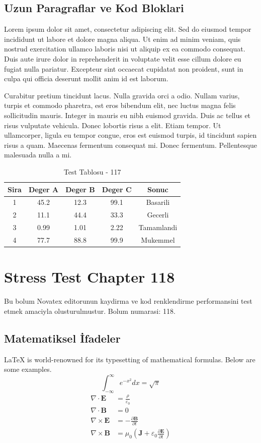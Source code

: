 \documentclass[12pt,a4paper]{article}
\begin{document}
\subsection{Uzun Paragraflar ve Kod Bloklari}
Lorem ipsum dolor sit amet, consectetur adipiscing elit. Sed do eiusmod tempor incididunt ut labore et dolore magna aliqua. Ut enim ad minim veniam, quis nostrud exercitation ullamco laboris nisi ut aliquip ex ea commodo consequat. Duis aute irure dolor in reprehenderit in voluptate velit esse cillum dolore eu fugiat nulla pariatur. Excepteur sint occaecat cupidatat non proident, sunt in culpa qui officia deserunt mollit anim id est laborum.

Curabitur pretium tincidunt lacus. Nulla gravida orci a odio. Nullam varius, turpis et commodo pharetra, est eros bibendum elit, nec luctus magna felis sollicitudin mauris. Integer in mauris eu nibh euismod gravida. Duis ac tellus et risus vulputate vehicula. Donec lobortis risus a elit. Etiam tempor. Ut ullamcorper, ligula eu tempor congue, eros est euismod turpis, id tincidunt sapien risus a quam. Maecenas fermentum consequat mi. Donec fermentum. Pellentesque malesuada nulla a mi.

\begin{table}[h!]
\centering
\begin{tabular}{|c|c|c|c|c|}
\hline
\textbf{Sira} & \textbf{Deger A} & \textbf{Deger B} & \textbf{Deger C} & \textbf{Sonuc} \\
\hline
1 & 45.2 & 12.3 & 99.1 & Basarili \\
2 & 11.1 & 44.4 & 33.3 & Gecerli \\
3 & 0.99 & 1.01 & 2.22 & Tamamlandi \\
4 & 77.7 & 88.8 & 99.9 & Mukemmel \\
\hline
\end{tabular}
\caption{Test Tablosu - 117}
\end{table}

\newpage
\section{Stress Test Chapter 118}
Bu bolum Novatex editorunun kaydirma ve kod renklendirme performansini test etmek amaciyla olusturulmustur. Bolum numarasi: 118.

\subsection{Matematiksel İfadeler}
\LaTeX{} is world-renowned for its typesetting of mathematical formulas. Below are some examples.
\begin{equation}
\int_{-\infty}^{\infty} e^{-x^2} dx = \sqrt{\pi}
\end{equation}
\begin{align}
\nabla \cdot \mathbf{E} &= \frac{\rho}{\varepsilon_0} \\
\nabla \cdot \mathbf{B} &= 0 \\
\nabla \times \mathbf{E} &= -\frac{\partial \mathbf{B}}{\partial t} \\
\nabla \times \mathbf{B} &= \mu_0\left(\mathbf{J} + \varepsilon_0 \frac{\partial \mathbf{E}}{\partial t}\right)
\end{align}
\end{document}
